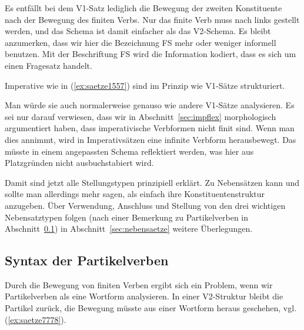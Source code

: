 Es entfällt bei dem V1-Satz lediglich die Bewegung der zweiten Konstituente nach der Bewegung des finiten Verbs.
Nur das finite Verb muss nach links gestellt werden, und das Schema ist damit einfacher als das V2-Schema.
Es bleibt anzumerken, dass wir hier die Bezeichnung FS mehr oder weniger informell benutzen.
Mit der Beschriftung FS wird die Information kodiert, dass es sich um einen Fragesatz handelt.

Imperative wie in (\ref{ex:saetze1557}) sind im Prinzip wie V1-Sätze strukturiert.

\begin{exe}
\end{exe}

Man würde sie auch normalerweise genauso wie andere V1-Sätze analysieren.
Es sei nur darauf verwiesen, dass wir in Abschnitt~\ref{sec:impflex} morphologisch argumentiert haben, dass imperativische Verbformen nicht finit sind.
Wenn man dies annimmt, wird in Imperativsätzen eine infinite Verbform herausbewegt.
Das müsste in einem angepassten Schema reflektiert werden, was hier aus Platzgründen nicht ausbuchstabiert wird.


\begin{sloppypar}
Damit sind jetzt alle Stellungstypen prinzipiell erklärt.
Zu Nebensätzen kann und sollte man allerdings mehr sagen, als einfach ihre Konstituentenstruktur anzugeben.
Über Verwendung, Anschluss und Stellung von den drei wichtigen Nebensatztypen folgen (nach einer Bemerkung zu Partikelverben in Abschnitt~\ref{sec:partikelverben}) in Abschnitt~\ref{sec:nebensaetze} weitere Überlegungen.
\end{sloppypar}

\subsection{Syntax der Partikelverben}

\label{sec:partikelverben}

Durch die Bewegung von finiten Verben ergibt sich ein Problem, wenn wir Partikelverben als eine Wortform analysieren.
In einer V2-Struktur bleibt die Partikel zurück, die Bewegung müsste aus einer Wortform heraus geschehen, vgl. (\ref{ex:saetze7778}).

\begin{exe}
\end{exe}

